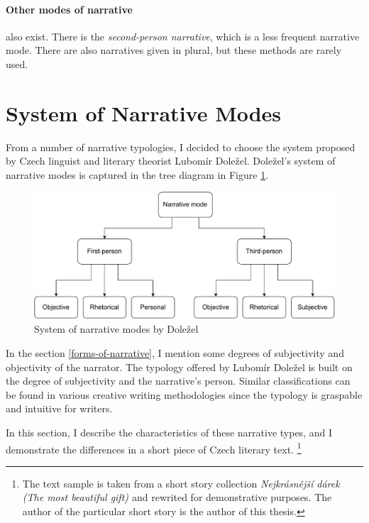 \paragraph{Other modes of narrative} also exist. There is the \emph{second-person narrative}, which is a less frequent narrative mode. There are also narratives given in plural, but these methods are rarely used.

\section{System of Narrative Modes}

From a number of narrative typologies, I decided to choose the system proposed by Czech linguist and literary theorist Lubomír Doležel. Doležel's system of narrative modes is captured in the tree diagram in Figure \ref{fig:schema-dolezel}.\cite{dolezel-narativni-zpusoby}

\begin{figure}[ht]
\includegraphics[width=1\textwidth]{data/dolezel-schema.pdf}
\caption{System of narrative modes by Doležel}
\label{fig:schema-dolezel}
\end{figure}

In the section \ref{forms-of-narrative}, I mention some degrees of subjectivity and objectivity of the narrator. The typology offered by Lubomír Doležel is built on the degree of subjectivity and the narrative's person. Similar classifications can be found in various creative writing methodologies \cite{docekalova} since the typology is graspable and intuitive for writers.

In this section, I describe the characteristics of these narrative types, and I demonstrate the differences in a short piece of Czech literary text. \footnote{The text sample is taken from a short story collection \emph{Nejkrásnější dárek (The most beautiful gift) \cite{nejkrasnejsi-darek}} and rewrited for demonstrative purposes. The author of the particular short story is the author of this thesis.}


